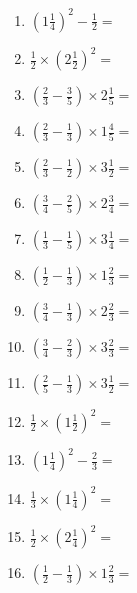 \documentclass[12pt]{article}
\begin{document}
\begin{enumerate}
\newpage
\item \large $ \left( 1 \frac{1}{4} \right)^2 - \frac{1}{2} = $ \vspace{1.6cm}
\item \large $ \frac{1}{2} \times \left( 2 \frac{1}{2} \right)^2 = $ \vspace{1.6cm}
\item \large $ \left( \frac{2}{3} - \frac{3}{5} \right) \times 2 \frac{1}{5} = $ \vspace{1.6cm}
\item \large $ \left( \frac{2}{3} - \frac{1}{3} \right) \times 1 \frac{4}{5} = $ \vspace{1.6cm}
\item \large $ \left( \frac{2}{3} - \frac{1}{2} \right) \times 3 \frac{1}{2} = $ \vspace{1.6cm}
\item \large $ \left( \frac{3}{4} - \frac{2}{5} \right) \times 2 \frac{3}{4} = $ \vspace{1.6cm}
\item \large $ \left( \frac{1}{3} - \frac{1}{5} \right) \times 3 \frac{1}{4} = $ \vspace{1.6cm}
\item \large $ \left( \frac{1}{2} - \frac{1}{3} \right) \times 1 \frac{2}{3} = $ \vspace{1.6cm}
\item \large $ \left( \frac{3}{4} - \frac{1}{3} \right) \times 2 \frac{2}{3} = $ \vspace{1.6cm}
\item \large $ \left( \frac{3}{4} - \frac{2}{3} \right) \times 3 \frac{2}{3} = $ \vspace{1.6cm}
\newpage
\item \large $ \left( \frac{2}{5} - \frac{1}{3} \right) \times 3 \frac{1}{2} = $ \vspace{1.6cm}
\item \large $ \frac{1}{2} \times \left( 1 \frac{1}{2} \right)^2 = $ \vspace{1.6cm}
\item \large $ \left( 1 \frac{1}{4} \right)^2 - \frac{2}{3} = $ \vspace{1.6cm}
\item \large $ \frac{1}{3} \times \left( 1 \frac{1}{4} \right)^2 = $ \vspace{1.6cm}
\item \large $ \frac{1}{2} \times \left( 2 \frac{1}{4} \right)^2 = $ \vspace{1.6cm}
\item \large $ \left( \frac{1}{2} - \frac{1}{3} \right) \times 1 \frac{2}{3} = $ \vspace{1.6cm}

\end{enumerate}
\end{document}
